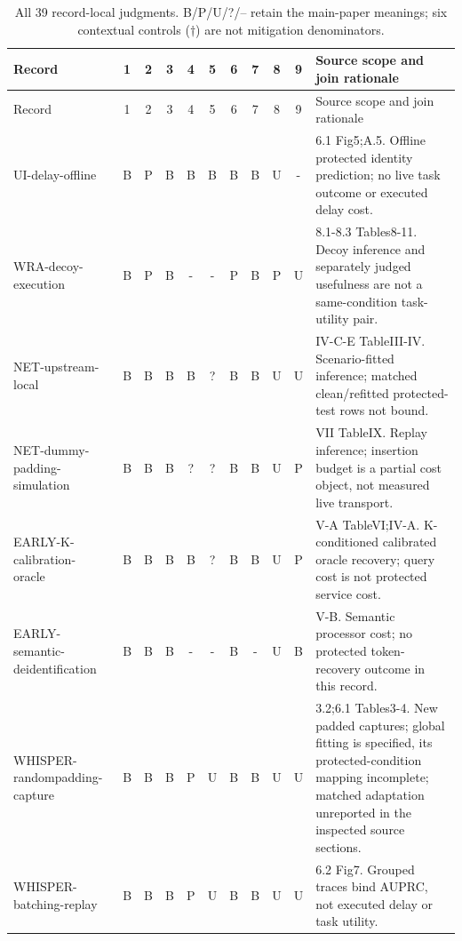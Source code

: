 \begin{longtable}{@{}p{}*{9}{c}p{}@{}}
\caption{All 39 record-local judgments. B/P/U/?/-- retain the main-paper meanings; six contextual controls ($\dagger$) are not mitigation denominators.}\label{tab:r19-record-cells}\\
\toprule Record & 1 & 2 & 3 & 4 & 5 & 6 & 7 & 8 & 9 & Source scope and join rationale\\\midrule\endfirsthead
\toprule Record & 1 & 2 & 3 & 4 & 5 & 6 & 7 & 8 & 9 & Source scope and join rationale\\\midrule\endhead
\bottomrule\endfoot
UI-\allowbreak{}delay-\allowbreak{}offline~\cite{uitraces2026} & B & P & B & B & B & B & B & U & - & 6.1 Fig5;A.5. Offline protected identity prediction; no live task outcome or executed delay cost.\\
WRA-\allowbreak{}decoy-\allowbreak{}execution~\cite{jeong2026wra} & B & P & B & - & - & P & B & P & U & 8.1-8.3 Tables8-11. Decoy inference and separately judged usefulness are not a same-condition task-utility pair.\\
NET-\allowbreak{}upstream-\allowbreak{}local~\cite{netecho2025} & B & B & B & B & ? & B & B & U & U & IV-C-E TableIII-IV. Scenario-fitted inference; matched clean/refitted protected-test rows not bound.\\
NET-\allowbreak{}dummy-\allowbreak{}padding-\allowbreak{}simulation~\cite{netecho2025} & B & B & B & ? & ? & B & B & U & P & VII TableIX. Replay inference; insertion budget is a partial cost object, not measured live transport.\\
EARLY-\allowbreak{}K-\allowbreak{}calibration-\allowbreak{}oracle~\cite{earlybird2025} & B & B & B & B & ? & B & B & U & P & V-A TableVI;IV-A. K-conditioned calibrated oracle recovery; query cost is not protected service cost.\\
EARLY-\allowbreak{}semantic-\allowbreak{}deidentification~\cite{earlybird2025} & B & B & B & - & - & B & - & U & B & V-B. Semantic processor cost; no protected token-recovery outcome in this record.\\
WHISPER-\allowbreak{}randompadding-\allowbreak{}capture~\cite{whisperleak2025} & B & B & B & P & U & B & B & U & U & 3.2;6.1 Tables3-4. New padded captures; global fitting is specified, its protected-condition mapping incomplete; matched adaptation unreported in the inspected source sections.\\
WHISPER-\allowbreak{}batching-\allowbreak{}replay~\cite{whisperleak2025} & B & B & B & P & U & B & B & U & U & 6.2 Fig7. Grouped traces bind AUPRC, not executed delay or task utility.\\

\end{longtable}
